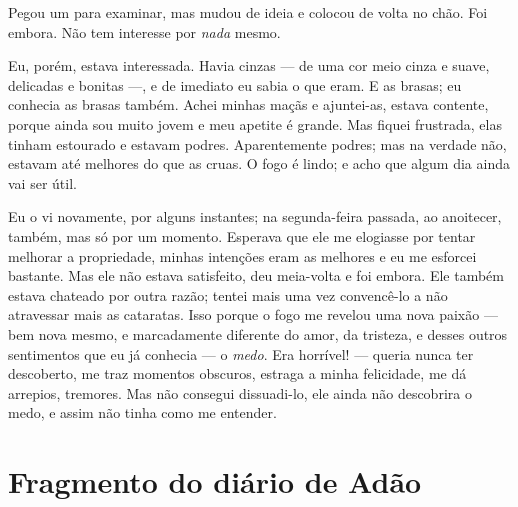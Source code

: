 Pegou um para examinar, mas mudou de ideia e colocou de volta no chão.
Foi embora. Não tem interesse por \textit{nada} mesmo.

Eu, porém, estava interessada. Havia cinzas --- de uma cor meio cinza e suave,
delicadas e bonitas ---, e de imediato eu sabia o que eram. E as brasas; eu
conhecia as brasas também. Achei minhas maçãs e ajuntei-as, estava contente,
porque ainda sou muito jovem e meu apetite é grande. Mas fiquei frustrada, elas
tinham estourado e estavam podres. Aparentemente podres; mas na verdade não,
estavam até melhores do que as cruas. O fogo é lindo; e acho que algum dia ainda
vai ser útil.

 Eu o vi novamente, por alguns instantes; na segunda-feira passada, ao
anoitecer, também, mas só por um momento. Esperava que ele me elogiasse por
tentar melhorar a propriedade, minhas intenções eram as melhores e eu
me esforcei bastante. Mas ele não estava satisfeito, deu meia-volta e foi embora.
Ele também estava chateado por outra razão; tentei mais uma vez convencê-lo
a não atravessar mais as cataratas. Isso porque o fogo me revelou uma nova
paixão --- bem nova mesmo, e marcadamente diferente do amor, da tristeza, e
desses outros sentimentos que eu já conhecia --- o \textit{medo}. Era horrível! ---
queria nunca ter descoberto, me traz momentos obscuros, estraga a minha
felicidade, me dá arrepios, tremores. Mas não consegui dissuadi-lo,
ele ainda não descobrira o medo, e assim não tinha como me entender.

\begin{center}
\leafNE
\end{center}


\section{Fragmento do diário de Adão}

